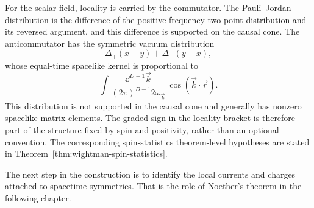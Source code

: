 \begin{remark}
For the scalar field, locality is carried by the commutator.  The Pauli--Jordan
distribution is the difference of the positive-frequency two-point distribution
and its reversed argument, and this difference is supported on the causal cone.
The anticommutator has the symmetric vacuum distribution
\[
  \Delta_+(x-y)+\Delta_+(y-x),
\]
whose equal-time spacelike kernel is proportional to
\[
  \int
  \frac{\dd^{D-1}\vec k}{(2\pi)^{D-1}2\omega_{\vec k}}\,
  \cos(\vec k\cdot\vec r).
\]
This distribution is not supported in the causal cone and generally has
nonzero spacelike matrix elements.  The graded sign in the locality bracket is
therefore part of the structure fixed by spin and positivity, rather than an
optional convention.  The corresponding spin-statistics theorem-level
hypotheses are stated in
Theorem~\ref{thm:wightman-spin-statistics}.
\end{remark}

The next step in the construction is to identify the local currents and
charges attached to spacetime symmetries. That is the role of Noether's
theorem in the following chapter.

